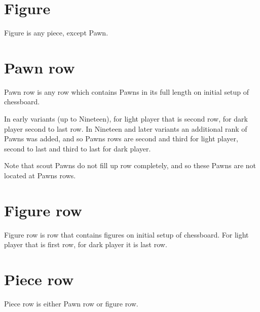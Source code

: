 \section*{Figure}
\label{sec:Terms/Figure}
Figure is any piece, except Pawn.

\section*{Pawn row}
\label{sec:Terms/Pawn row}
Pawn row is any row which contains Pawns in its full length on initial setup
of chessboard.

In early variants (up to Nineteen), for light player that is second row, for
dark player second to last row. In Nineteen and later variants an additional
rank of Pawns was added, and so Pawns rows are second and third for light
player, second to last and third to last for dark player.

Note that scout Pawns do not fill up row completely, and so these Pawns are
not located at Pawns rows.

\section*{Figure row}
\label{sec:Terms/Figure row}
Figure row is row that contains figures on initial setup of chessboard.
For light player that is first row, for dark player it is last row.

\section*{Piece row}
\label{sec:Terms/Piece row}
Piece row is either Pawn row or figure row.

\clearpage %
